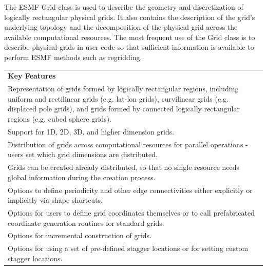 %

The ESMF Grid class is used to describe the geometry and discretization
of logically rectangular physical grids.  It also contains the
description of the grid's underlying topology and the decomposition
of the physical grid across the available computational resources.
The most frequent use of the Grid class is to describe physical grids
in user code so that sufficient information is available to perform ESMF
methods such as regridding.  



\begin{center}
\begin{tabular}{|p{6in}|}
\hline
\vspace{.01in}
{\bf Key Features} \\[.01in]
Representation of grids formed by logically rectangular regions,
including uniform and rectilinear grids (e.g. lat-lon grids),
curvilinear grids (e.g. displaced pole grids), and grids formed
by connected logically rectangular regions (e.g. cubed sphere grids).\\
Support for 1D, 2D, 3D, and higher dimension grids.\\ 
Distribution of grids across computational resources for parallel
operations - users set which grid dimensions are distributed.\\
Grids can be created already distributed, so that no single
resource needs global information during the creation process.\\
Options to define periodicity and other edge connectivities either 
explicitly or implicitly via shape shortcuts.\\ 
Options for users to define grid coordinates themselves or to call
prefabricated coordinate generation routines for standard grids.\\
Options for incremental construction of grids.\\
Options for using a set of pre-defined stagger locations or for setting
custom stagger locations.\\ [.03in] \hline
\end{tabular}
\end{center}

